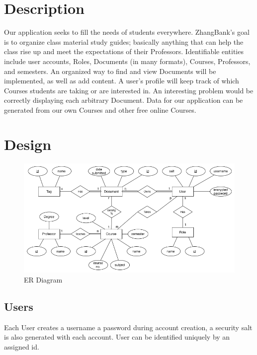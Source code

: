 \documentclass[11pt]{article}
\title{}
\author{}
\date{\today}
\begin{document}


\tableofcontents

\pagebreak

\section{Description}
\label{sec-1}


  Our application seeks to fill the needs of students
  everywhere. ZhangBank's goal is to organize class material study
  guides; basically anything that can help the class rise up and meet
  the expectations of their Professors. Identifiable entities include
  user accounts, Roles, Documents (in many formats), Courses,
  Professors, and semesters. An organized way to find and view
  Documents will be implemented, as well as add content. A user's
  profile will keep track of which Courses students are taking or are
  interested in. An interesting problem would be correctly displaying
  each arbitrary Document. Data for our application can be generated
  from our own Courses and other free online Courses.
  
\section{Design}
\label{sec-2}


  \begin{figure}[htb]
  \centering
  \includegraphics[width=.9\linewidth]{ERDiagram.png}
  \caption{ER Diagram}
  \end{figure}
  
\subsection{Users}
\label{sec-2-1}

   
   Each User creates a username a password during account creation, a
   security salt is also generated with each account. User can be
   identified uniquely by an assigned id.
\end{document}
